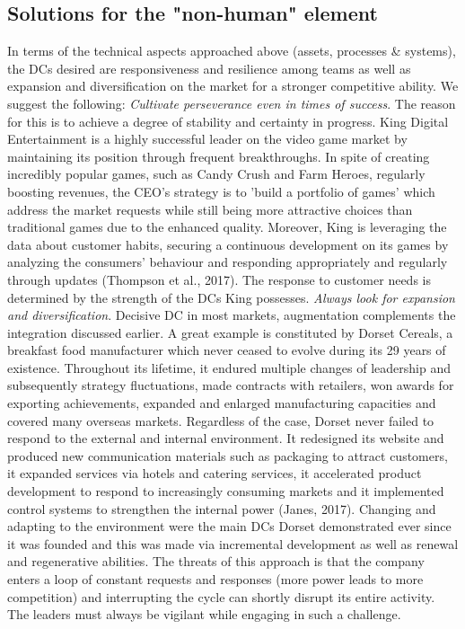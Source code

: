 \documentclass[11pt]{article}
\begin{document}
\subsection{Solutions for the "non-human" element}
In terms of the technical aspects approached above (assets, processes \& systems), the DCs desired are responsiveness and resilience among teams as well as expansion and diversification on the market for a stronger competitive ability. We suggest the following: \newline \newline
\emph{Cultivate perseverance even in times of success}. The reason for this is to achieve a degree of stability and certainty in progress. King Digital Entertainment is a highly successful leader on the video game market by maintaining its position through frequent breakthroughs. In spite of creating incredibly popular games, such as Candy Crush and Farm Heroes, regularly boosting revenues, the CEO's strategy is to 'build a portfolio of games' which address the market requests while still being more attractive choices than traditional games due to the enhanced quality. Moreover, King is leveraging the data about customer habits, securing a continuous development on its games by analyzing the consumers' behaviour and responding appropriately and regularly through updates (Thompson et al., 2017). The response to customer needs is determined by the strength of the DCs King possesses.
\newline\newline
\emph{Always look for expansion and diversification}. Decisive DC in most markets, augmentation complements the integration discussed earlier. A great example is constituted by Dorset Cereals, a breakfast food manufacturer which never ceased to evolve during its 29 years of existence. Throughout its lifetime, it endured multiple changes of leadership and subsequently strategy fluctuations, made contracts with retailers, won awards for exporting achievements, expanded and enlarged manufacturing capacities and covered many overseas markets. Regardless of the case, Dorset never failed to respond to the external and internal environment. It redesigned its website and produced new communication materials such as packaging to attract customers, it expanded services via hotels and catering services, it accelerated product development to respond to increasingly consuming markets and it implemented control systems to strengthen the internal power (Janes, 2017).
Changing and adapting to the environment were the main DCs Dorset demonstrated ever since it was founded and this was made via incremental development as well as renewal and regenerative abilities. The threats of this approach is that the company enters a loop of constant requests and responses (more power leads to more competition) and interrupting the cycle can shortly disrupt its entire activity. The leaders must always be vigilant while engaging in such a challenge.
\end{document}
